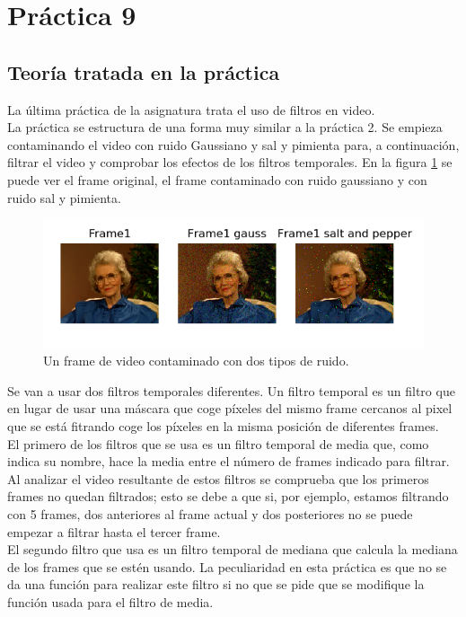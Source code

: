 \documentclass[a4paper,12pt]{report}
\begin{document}
\section{ Práctica 9}
\subsection{Teoría tratada en la práctica}

La última práctica de la asignatura trata el uso de filtros en video.\\

La práctica se estructura de una forma muy similar a la práctica 2. Se empieza contaminando el video con ruido Gaussiano y sal y pimienta para, a continuación, filtrar el video y comprobar los efectos de los filtros temporales. En la figura \ref{ruidovideo} se puede ver el frame original, el frame contaminado con ruido gaussiano y con ruido sal y pimienta.\\
\begin{figure}[h]
\centering
\includegraphics[width=1.0\textwidth]{imagenes/ruidovideo}
\caption{Un frame de video contaminado con dos tipos de ruido.}
\label{ruidovideo} 
\end{figure}

Se van a usar dos filtros temporales diferentes. Un filtro temporal es un filtro que en lugar de usar una máscara que coge píxeles del mismo frame cercanos al pixel que se está fitrando coge los píxeles en la misma posición de diferentes frames.\\

El primero de los filtros que se usa es un filtro temporal de media que, como indica su nombre, hace la media  entre el número de frames indicado para filtrar. Al analizar el video resultante de estos filtros se comprueba que los primeros frames no quedan filtrados; esto se debe a que si, por ejemplo, estamos filtrando con 5 frames, dos anteriores al frame actual y dos posteriores no se puede empezar a filtrar hasta el tercer frame.\\

El segundo filtro que usa es un filtro temporal de mediana que calcula la mediana de los frames que se estén usando. La peculiaridad en esta práctica es que no se da una función para realizar este filtro si no que se pide que se modifique la función usada para el filtro de media.\\
\end{document}
